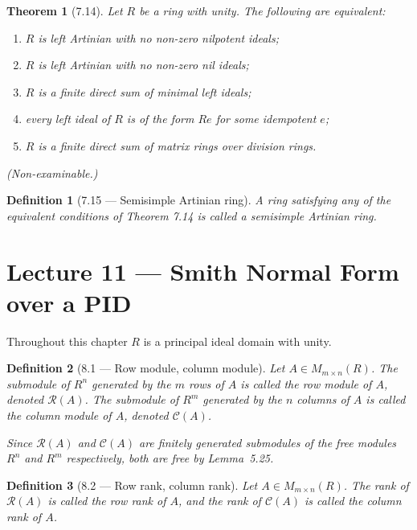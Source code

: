 \documentclass[12pt]{article}
\newtheorem{theorem}{Theorem}
\newtheorem{definition}{Definition}
\begin{document}
\begin{theorem}[7.14]
Let $R$ be a ring with unity. The following are equivalent:
\begin{enumerate}[label=(\roman*)]
  \item $R$ is left Artinian with no non-zero nilpotent ideals;
  \item $R$ is left Artinian with no non-zero nil ideals;
  \item $R$ is a finite direct sum of minimal left ideals;
  \item every left ideal of $R$ is of the form $Re$ for some idempotent $e$;
  \item $R$ is a finite direct sum of matrix rings over division rings.
\end{enumerate}
\end{theorem}

\noindent\textit{(Non-examinable.)}

\begin{definition}[7.15 — Semisimple Artinian ring]
A ring satisfying any of the equivalent conditions of Theorem 7.14 is called a \emph{semisimple Artinian ring}.
\end{definition}

\section*{Lecture 11 — Smith Normal Form over a PID}

Throughout this chapter $R$ is a principal ideal domain with unity.

\begin{definition}[8.1 — Row module, column module]
Let $A \in M_{m \times n}(R)$. The submodule of $R^n$ generated by the $m$ rows of $A$ is called the \emph{row module} of $A$, denoted $\mathcal{R}(A)$. The submodule of $R^m$ generated by the $n$ columns of $A$ is called the \emph{column module} of $A$, denoted $\mathcal{C}(A)$.

Since $\mathcal{R}(A)$ and $\mathcal{C}(A)$ are finitely generated submodules of the free modules $R^n$ and $R^m$ respectively, both are free by Lemma~5.25.
\end{definition}

\begin{definition}[8.2 — Row rank, column rank]
Let $A \in M_{m \times n}(R)$. The rank of $\mathcal{R}(A)$ is called the \emph{row rank} of $A$, and the rank of $\mathcal{C}(A)$ is called the \emph{column rank} of $A$.
\end{definition}
\end{document}

